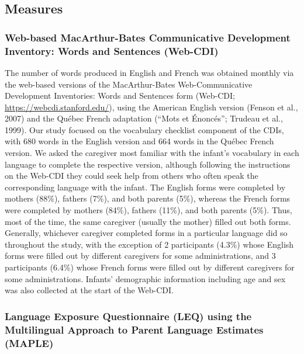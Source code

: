 \documentclass[
  ,man,floatsintext]{apa6}
\begin{document}
\hypertarget{measures}{%
\subsection{Measures}\label{measures}}

\hypertarget{web-based-macarthur-bates-communicative-development-inventory-words-and-sentences-web-cdi}{%
\subsubsection{Web-based MacArthur-Bates Communicative Development Inventory: Words and Sentences (Web-CDI)}\label{web-based-macarthur-bates-communicative-development-inventory-words-and-sentences-web-cdi}}

The number of words produced in English and French was obtained monthly via the web-based versions of the MacArthur-Bates Web-Communicative Development Inventories: Words and Sentences form (Web-CDI; \url{https://webcdi.stanford.edu/}), using the American English version (Fenson et al., 2007) and the Québec French adaptation (``Mots et Énoncés''; Trudeau et al., 1999). Our study focused on the vocabulary checklist component of the CDIs, with 680 words in the English version and 664 words in the Québec French version. We asked the caregiver most familiar with the infant's vocabulary in each language to complete the respective version, although following the instructions on the Web-CDI they could seek help from others who often speak the corresponding language with the infant. The English forms were completed by mothers (88\%), fathers (7\%), and both parents (5\%), whereas the French forms were completed by mothers (84\%), fathers (11\%), and both parents (5\%). Thus, most of the time, the same caregiver (usually the mother) filled out both forms. Generally, whichever caregiver completed forms in a particular language did so throughout the study, with the exception of 2 participants (4.3\%) whose English forms were filled out by different caregivers for some administrations, and 3 participants (6.4\%) whose French forms were filled out by different caregivers for some administrations. Infants' demographic information including age and sex was also collected at the start of the Web-CDI.

\hypertarget{language-exposure-questionnaire-leq-using-the-multilingual-approach-to-parent-language-estimates-maple}{%
\subsubsection{Language Exposure Questionnaire (LEQ) using the Multilingual Approach to Parent Language Estimates (MAPLE)}\label{language-exposure-questionnaire-leq-using-the-multilingual-approach-to-parent-language-estimates-maple}}
\end{document}
